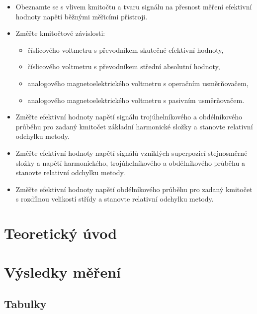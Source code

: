 \documentclass[a4paper, czech]{article}
\begin{document}
\begin{itemize}
    \item Obeznamte se s vlivem kmitočtu a tvaru signálu na přesnost měření efektivní hodnoty
    napětí běžnými měřicími přístroji.
    \item Změřte kmitočtové závislosti:
    \begin{itemize}
        \item číslicového voltmetru s převodníkem skutečné efektivní hodnoty,
        \item číslicového voltmetru s převodníkem střední absolutní hodnoty,
        \item analogového magnetoelektrického voltmetru s operačním usměrňovačem,
        \item analogového magnetoelektrického voltmetru s pasivním usměrňovačem.
    \end{itemize}
    \item Změřte efektivní hodnoty napětí signálu trojúhelníkového a obdélníkového průběhu
    pro zadaný kmitočet základní harmonické složky a stanovte relativní odchylku
    metody.
    \item Změřte efektivní hodnoty napětí signálů vzniklých superpozicí stejnosměrné složky
    a napětí harmonického, trojúhelníkového a obdélníkového průběhu a stanovte relativní
    odchylku metody.
    \item Změřte efektivní hodnoty napětí obdélníkového průběhu pro zadaný kmitočet
    s rozdílnou velikostí střídy a stanovte relativní odchylku metody.
\end{itemize}

\section{Teoretický úvod}

\section{Výsledky měření}

\subsection{Tabulky}
\end{document}
